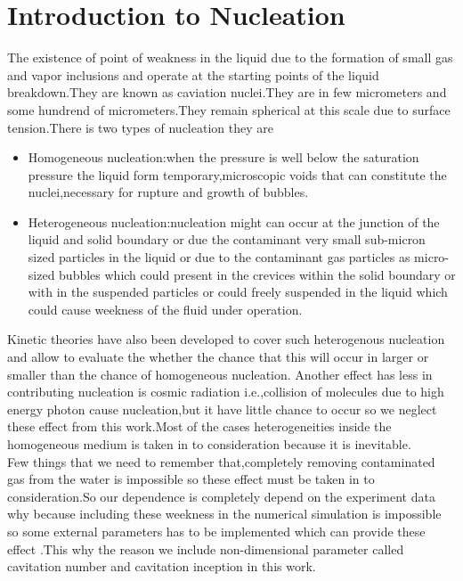 \section{Introduction to Nucleation}
The existence of point of weakness in the liquid due to the formation of small gas and vapor inclusions and operate at the starting points of the liquid breakdown.They are known as caviation nuclei.They are 
in few micrometers and some hundrend of micrometers.They remain spherical at this scale due to surface tension.There is two types of nucleation they are
\begin{itemize}
\item Homogeneous nucleation:when the pressure is well below the saturation pressure the liquid form temporary,microscopic voids that can constitute the nuclei,necessary for rupture and growth of bubbles.
\item Heterogeneous nucleation:nucleation might can occur at the junction of the liquid and solid boundary or due the contaminant very small sub-micron sized particles in the liquid or due to the
contaminant gas particles as micro-sized bubbles which could present in the crevices within the solid boundary or with in the suspended particles or could freely suspended in the liquid which could cause 
 weekness of the fluid  under operation.
 \end{itemize}
 Kinetic theories have also been developed to cover such heterogenous nucleation and allow to evaluate the whether the chance that this will occur in larger or smaller than the chance of homogeneous nucleation.
 Another effect has less  in contributing nucleation is cosmic radiation i.e.,collision of molecules due to high energy photon cause nucleation,but it have little chance to occur so we neglect these
 effect from this work.Most of the cases heterogeneities inside the homogeneous medium is taken in to consideration  because it is inevitable.\\
 Few things that we need to remember that,completely removing contaminated gas from the water is impossible so these effect must be taken in to consideration.So our dependence is completely depend on the
 experiment data why because including these weekness in the numerical simulation is impossible so some external parameters has to be implemented which can provide these effect .This why the reason we include non-dimensional parameter called cavitation number and cavitation inception
 in this work.\\
